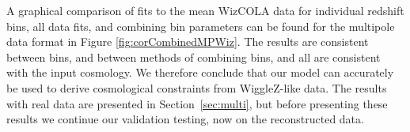 \documentclass[iop,twocolappendix]{emulateapj}
\begin{document}


 A graphical comparison of fits to the mean WizCOLA data for individual redshift bins, all data fits, and combining bin parameters can be found for the multipole data format in Figure \ref{fig:corCombinedMPWiz}. 
 The results are consistent between bins, and between methods of combining bins, and all are consistent with the input cosmology.  We therefore conclude that our model can accurately be used to derive cosmological constraints from WiggleZ-like data.  The results with real data are presented in Section~\ref{sec:multi}, but before presenting these results we continue our validation testing, now on the reconstructed data. 


\end{document}
